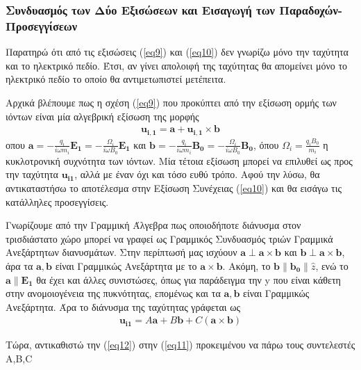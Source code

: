 \documentclass[a4paper]{article}
\begin{document}
        \subsubsection*{Συνδυασμός των Δύο Εξισώσεων και Εισαγωγή των Παραδοχών-Προσεγγίσεων}
            
		Παρατηρώ ότι από τις εξισώσεις (\ref{eq9}) και (\ref{eq10}) δεν γνωρίζω μόνο την ταχύτητα και το ηλεκτρικό πεδίο. Έτσι, αν γίνει απολοιφή της ταχύτητας θα απομείνει μόνο το ηλεκτρικό πεδίο το οποίο θα αντιμετωπιστεί μετέπειτα.            
            
                    Αρχικά βλέπουμε πως η σχέση (\ref{eq9}) που προκύπτει από την εξίσωση ορμής των ιόντων είναι μία αλγεβρική εξίσωση της μορφής 
                        \begin{align}\label{eq11}
                            \bm{u_{i,1}} = \bm{a} + \bm{u_{i,1}}\times\bm{b}
                        \end{align}
                        οπου $\bm{a} = -\frac{q_i}{i\omega m_i}\bm{E_1}=-\frac{\Omega_{i}}{i\omega B_0}\bm{E_1}$ και $\bm{b} = -\frac{q_i}{i\omega m_i}\bm{B_0} = - \frac{\Omega_i}{i\omega B_0}\bm{B_0}$, όπου $\Omega_i = \frac{q_iB_0}{m_i}$ η κυκλοτρονική συχνότητα των ιόντων. Μία τέτοια εξίσωση μπορεί να επιλυθεί ως προς την ταχύτητα $\bm{u_{i1}}$, αλλά με έναν όχι και τόσο ευθύ τρόπο. Αφού την λύσω, θα αντικαταστήσω το αποτέλεσμα στην Εξίσωση Συνέχειας (\ref{eq10}) και θα εισάγω τις κατάλληλες προσεγγίσεις. 

                        Γνωρίζουμε από την Γραμμική Άλγεβρα πως οποιοδήποτε διάνυσμα στον τρισδιάστατο χώρο μπορεί να γραφεί ως Γραμμικός Συνδυασμός τριών Γραμμικά Ανεξάρτητων διανυσμάτων. Στην περίπτωσή μας ισχύουν $\bm{a}\perp\bm{a}\times\bm{b}$ και $\bm{b}\perp\bm{a}\times\bm{b}$, άρα τα $\bm{a},\bm{b}$ είναι Γραμμικώς Ανεξάρτητα με το $\bm{a}\times\bm{b}$. Ακόμη, το $\bm{b}\parallel\bm{b_0}\parallel\hat{z}$,  ενώ το $\bm{a}\parallel\bm{E_1}$ θα έχει και άλλες συνιστώσες, όπως για παράδειγμα την y που είναι κάθετη στην ανομοιογένεια της πυκνότητας, επομένως και τα $\bm{a}, \bm{b}$ είναι Γραμμικώς Ανεξάρτητα. Άρα το διάνυσμα της ταχύτητας γράφεται ως 
                            \begin{align}\label{eq12}
                                \bm{u_{i1}} = A\bm{a} + B\bm{b} + C (\bm{a}\times\bm{b}) 
                            \end{align}

                        Τώρα, αντικαθιστώ την (\ref{eq12}) στην (\ref{eq11}) προκειμένου να πάρω τους συντελεστές A,B,C
\end{document}
